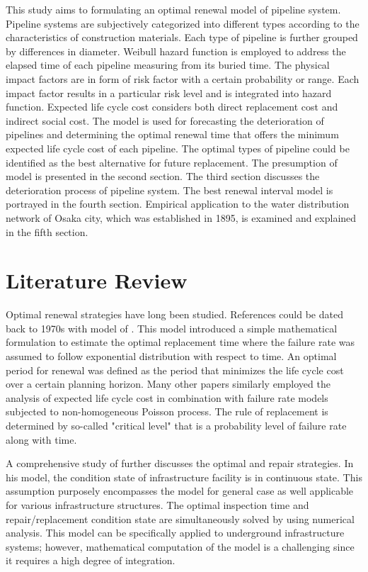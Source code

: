 \documentclass[a4paper,oneside,onecolumn,preprint,10pt,authoryear]{elsarticle}
\begin{document}
This study aims to formulating an optimal renewal model of pipeline system. Pipeline systems are subjectively categorized into different types according to the characteristics of construction materials. Each type of pipeline is further grouped by differences in diameter. Weibull hazard function is employed to address the elapsed time of each pipeline measuring from its buried time. The physical impact factors are in form of risk factor with a certain probability or range. Each impact factor results in a particular risk level and is integrated into hazard function. Expected life cycle cost considers both direct replacement cost and indirect social cost. The model is used for forecasting the deterioration of pipelines and determining the optimal renewal time that offers the minimum expected life cycle cost of each pipeline. The optimal types of pipeline could be identified as the best alternative for future replacement. The presumption of model is presented in the second section. The third section discusses the deterioration process of pipeline system. The best renewal interval model is portrayed in the fourth section. Empirical application to the water distribution network of Osaka city, which was established in 1895, is examined and explained in the fifth section.
\section{Literature Review}
\label{52}
Optimal renewal strategies have long been studied. References could be dated back to 1970s with model of \citet{shamir79}. This model introduced a simple mathematical formulation to estimate the optimal replacement time where the failure rate was assumed to follow exponential distribution with respect to time. An optimal period for renewal was defined as the period that minimizes the life cycle cost over a certain planning horizon. Many other papers similarly employed the analysis of expected life cycle cost in combination with failure rate models subjected to non-homogeneous Poisson process\cite{park00,hong06,Kleiner01}. The rule of replacement is determined by so-called "critical level" that is a probability level of failure rate along with time.

A comprehensive study of \citet{jido} further discusses the optimal and repair strategies. In his model, the condition state of infrastructure facility is in continuous state. This assumption purposely encompasses the model for general case as well applicable for various infrastructure structures. The optimal inspection time and repair/replacement condition state are simultaneously solved by using numerical analysis. This model can be specifically applied to underground infrastructure systems; however, mathematical computation of the model is a challenging since it requires a high degree of integration.
\end{document}
